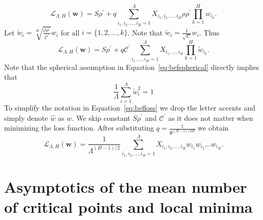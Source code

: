 \documentclass[twoside]{article}
\begin{document}
\[\mathcal{L}_{\Lambda,H}({\bm w}) = S\rho^{'} \!+\! q\sum_{i_1,i_2,\dots,i_H=1}^{\Lambda}\!\!\!\!\!\!\!X_{i_1,i_2,\dots,i_H}\rho\rho^{'}\prod_{k = 1}^{H}w_{i_k}.
\]
Let $\tilde{w}_i = \sqrt[H]{\frac{\rho\rho^{'}}{\mathcal{C}^{'}}}w_i$ for all $i = \{1,2,\dots,k\}$. Note that $\tilde{w}_i = \frac{1}{\sqrt{C}}w_i$. Thus
\begin{equation}
\mathcal{L}_{\Lambda,H}({\bm w}) = S\rho^{'} + q\mathcal{C}^{'}\sum_{i_1,\dots,i_H=1}^{\Lambda}X_{i_1,\dots,i_H}\prod_{k = 1}^{H}\tilde{w}_{i_k}.
\label{eq:befloss}
\end{equation}
Note that the spherical assumption in Equation~\ref{eq:befspherical} directly implies that
\begin{equation*}
\frac{1}{\Lambda}\sum_{i=1}^{\Lambda}\tilde{w}_i^2 = 1
\end{equation*}
To simplify the notation in Equation~\ref{eq:befloss} we drop the letter accents and simply denote $\hat{w}$ as $w$. We skip constant $S\rho^{'}$ and $\mathcal{C}^{'}$ as it does not matter when minimizing the loss function. After substituting $q = \frac{1}{\Psi^{(H-1)/2H}}$ we obtain
\begin{equation*}
\mathcal{L}_{\!\Lambda,H}({\bm w}) \!=\! \frac{1}{\Lambda^{\!(H\!-\!1)/2}}\!\!\!\!\!\!\!\sum_{i_1,i_2,\dots,i_H=1}^{\Lambda}\!\!\!\!\!\!\!\!\!\!\!X_{i_1,i_2,\dots,i_H}\!w_{i_1}\!w_{i_2}\!\!\dots\!w_{i_H}.
\end{equation*}

\section{Asymptotics of the mean number of critical points and local minima}
\end{document}
